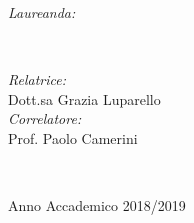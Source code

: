 \begin{titlepage}
\makeatletter
\HRule \\[0.4cm]
{ \huge \bfseries \@title}\\[0.4cm] %
\HRule \\[2.5cm]
 

\begin{minipage}{0.4\textwidth}
\begin{flushleft} \large
\emph{Laureanda:}\\
\@author %
\end{flushleft}
\end{minipage}
~
\begin{minipage}{0.4\textwidth}
\begin{flushright} \large
\emph{Relatrice:} \\
Dott.sa Grazia Luparello
\\[1.2em]
\emph{Correlatore:} \\
Prof. Paolo Camerini
\end{flushright}
\end{minipage}\\[5cm]
\makeatother



{\large Anno Accademico 2018/2019 }\\[0.5cm]

\vfill %

\end{titlepage}
